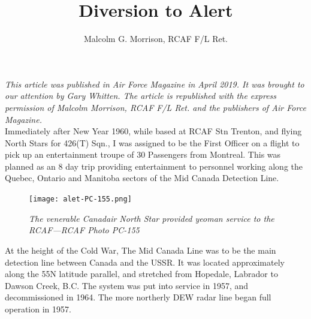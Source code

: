 %


\title{Diversion to Alert}
\author{Malcolm G. Morrison, RCAF F/L Ret.}

\maketitle





\textit{This article was published in Air Force Magazine in April 2019. It was
brought to our attention by Gary Whitten. The article is republished
with the express permission of Malcolm Morrison, RCAF F/L Ret. and the
publishers of Air Force Magazine.}\\

Immediately after New Year 1960, while based at RCAF Stn Trenton, and
flying North Stars for 426(T) Sqn., I was assigned to be the First
Officer on a flight to pick up an entertainment troupe of 30 Passengers
from Montreal. This was planned as an 8 day trip providing
entertainment to personnel working along the Quebec, Ontario and
Manitoba sectors of the Mid Canada Detection Line.

\begin{figure}[httb]
   \vspace{2em}
   \centering
   \texttt{[image: alet-PC-155.png]}
   \caption*{\small \em The venerable Canadair North Star provided yeoman service to the RCAF---RCAF Photo PC-155}
   \label{fig:wall-two}
\end{figure}

At the height of the Cold War, The Mid Canada Line was to be the main
detection line between Canada and the USSR. It was located
approximately along the 55N latitude parallel, and stretched from
Hopedale, Labrador to Dawson Creek, B.C. The system was put into
service in 1957, and decommissioned in 1964. The more northerly DEW
radar line began full operation in 1957.

